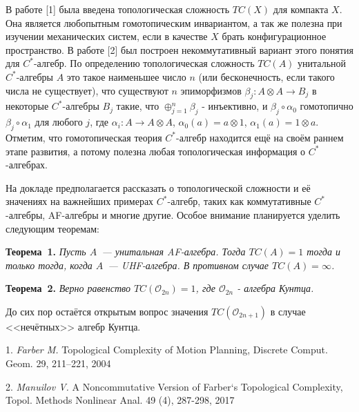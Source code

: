 




В работе [1] была введена топологическая сложность $TC(X)$ для компакта $X$. Она является любопытным гомотопическим инвариантом, а так же полезна при изучении механических систем, если в качестве $X$ брать конфигурационное пространство. В работе [2] был построен некоммутативный вариант этого понятия для $C^*$-алгебр. По определению топологическая сложность $TC(A)$ унитальной $C^*$-алгебры $A$ это такое наименьшее число $n$ (или бесконечность, если такого числа не существует), что существуют $n$ эпиморфизмов $\beta_j:A\otimes A\to B_j$ в некоторые $C^*$-алгебры $B_j$ такие, что $\oplus_{j=1}^n\beta_j$ - инъективно, и $\beta_j\circ\alpha_0$ гомотопично $\beta_j\circ\alpha_1$ для любого $j$, где $\alpha_i:A\to A\otimes A$, $\alpha_0(a)=a\otimes1$, $\alpha_1(a)=1\otimes a$. Отметим, что гомотопическая теория $C^*$-алгебр находится ещё на своём раннем этапе развития, а потому полезна любая топологическая информация о $C^*$-алгебрах.

На докладе предполагается рассказать о топологической сло\-жности и её значениях на важнейших примерах $C^*$-алгебр, таких как коммутативные $C^*$-алгебры, AF-алгебры и многие другие. Особое внимание планируется уделить следующим теоремам:

\textbf{Теорема~1.} {\it Пусть $A$~--- унитальная AF-алгебра.
Тогда
\linebreak
${TC(A)=1}$ тогда и только тогда, когда $A$~--- UHF-алгебра. В противном случае $TC(A)=\infty$.}

\textbf{Теорема~2.} {\it Верно равенство $TC(\mathcal{O}_{2n})=1$, где $\mathcal{O}_{2n}$ - алгебра Кунтца.}

До сих пор остаётся открытым вопрос значения $TC(\mathcal{O}_{2n+1})$ в случае <<нечётных>> алгебр Кунтца.

\litlist

1. {\it Farber M.} Topological Complexity of Motion Planning, Dis\-c\-re\-te Comput. Geom. 29, 211–221, 2004

2. {\it Manuilov V.} A Noncommutative Version of Farber`s Topo\-lo\-gi\-cal Complexity, Topol. Methods Nonlinear
Anal. 49 (4), 287-298, 2017
